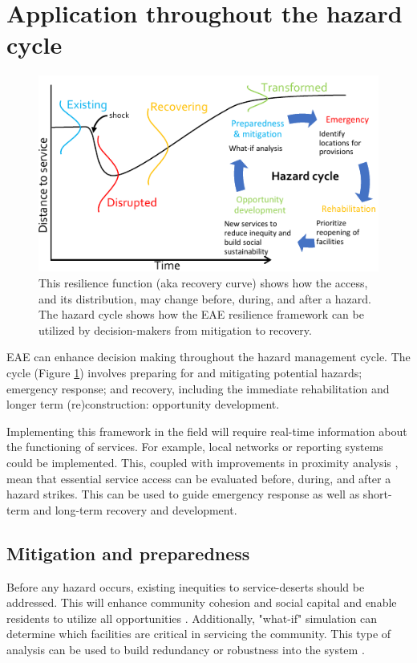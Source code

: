 \documentclass[onecolumn,doublespacing]{risa}
\let \cite \parencite
\begin{document}
\section{Application throughout the hazard cycle}
\begin{figure}
    \centering
    \includegraphics[width=\linewidth]{report/fig/Figure_hazardCycle.pdf}
    \caption{This resilience function (aka recovery curve) shows how the access, and its distribution, may change before, during, and after a hazard. The hazard cycle shows how the EAE resilience framework can be utilized by decision-makers from mitigation to recovery.}
    \label{fig:haz_cycle}
\end{figure}
EAE can enhance decision making throughout the hazard management cycle. 
The cycle (Figure \ref{fig:haz_cycle}) involves preparing for and mitigating potential hazards; emergency response; and recovery, including the immediate rehabilitation and longer term (re)construction: opportunity development.

Implementing this framework in the field will require real-time information about the functioning of services.
For example, local networks or reporting systems could be implemented.
This, coupled with improvements in proximity analysis \cite{Logan2017-fr, noel2019-pypi}, mean that essential service access can be evaluated before, during, and after a hazard strikes.
This can be used to guide emergency response as well as short-term and long-term recovery and development. 

\subsection{Mitigation and preparedness}
Before any hazard occurs, existing inequities to service-deserts should be addressed.
This will enhance community cohesion and social capital \cite{Dempsey2011-og} and enable residents to utilize all opportunities \cite{Cutter2010-vg}.
Additionally, "what-if" simulation can determine which facilities are critical in servicing the community. 
This type of analysis can be used to build redundancy or robustness into the system \cite{Wardekker2010-hw}.
\end{document}

